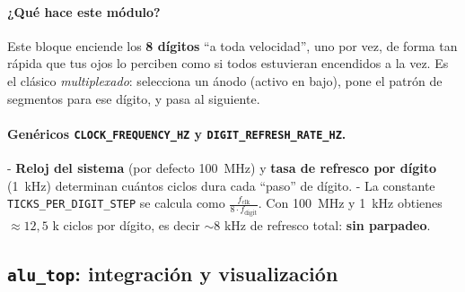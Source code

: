 \documentclass[a4paper,12pt]{article}
\begin{document}
\paragraph{¿Qué hace este módulo?}
Este bloque enciende los \textbf{8 dígitos} “a toda velocidad”, uno por vez, de forma tan rápida que tus ojos lo perciben como si todos estuvieran encendidos a la vez. Es el clásico \emph{multiplexado}: selecciona un ánodo (activo en bajo), pone el patrón de segmentos para ese dígito, y pasa al siguiente.

\paragraph{Genéricos \texttt{CLOCK\_FREQUENCY\_HZ} y \texttt{DIGIT\_REFRESH\_RATE\_HZ}.}
- \textbf{Reloj del sistema} (por defecto 100~MHz) y \textbf{tasa de refresco por dígito} (1~kHz) determinan cuántos ciclos dura cada “paso” de dígito.  
- La constante \texttt{TICKS\_PER\_DIGIT\_STEP} se calcula como \(\frac{f_\text{clk}}{8\cdot f_\text{digit}}\). Con 100~MHz y 1~kHz obtienes \(\approx 12{,}5\) k ciclos por dígito, es decir \(\sim 8\) kHz de refresco total: \textbf{sin parpadeo}.

\newpage

\subsection{\texttt{alu\_top}: integración y visualización}
\label{subsec:alu-top}
\end{document}
